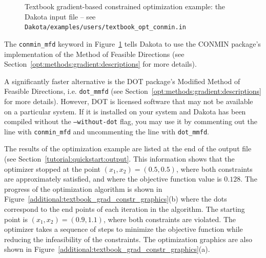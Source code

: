 \begin{figure}[ht!]
  \centering
  \begin{bigbox}
    \begin{small}
    \end{small}
  \end{bigbox}
  \caption{Textbook gradient-based constrained optimization example:
    the Dakota input file --
see \texttt{Dakota/examples/users/textbook\_opt\_conmin.in} }
  \label{additional:textbook_grad_constr}
\end{figure}

The \texttt{conmin\_mfd} keyword in
Figure~\ref{additional:textbook_grad_constr} tells Dakota to use the
CONMIN package's implementation of the Method of Feasible Directions
(see Section~\ref{opt:methods:gradient:descriptions} for more
details).

A significantly faster alternative is the DOT package's Modified
Method of Feasible Directions, i.e. \texttt{dot\_mmfd} (see
Section~\ref{opt:methods:gradient:descriptions} for more
details). However, DOT is licensed software that may not be available
on a particular system. If it is installed on your system and Dakota
has been compiled without the \texttt{--without-dot} flag, you may use
it by commenting out the line with \texttt{conmin\_mfd} and
uncommenting the line with \texttt{dot\_mmfd}.

The results of the optimization example are listed at the end of
the output file (see Section~\ref{tutorial:quickstart:output}.
This information shows that the
optimizer stopped at the point $(x_1,x_2) = (0.5,0.5)$, where both
constraints are approximately satisfied, and where the objective function value is
$0.128$. The progress of the optimization algorithm is shown in
Figure~\ref{additional:textbook_grad_constr_graphics}(b) where the
dots correspond to the end points of each iteration in the algorithm. The
starting point is $(x_1,x_2) = (0.9,1.1)$, where both constraints
are violated. The optimizer takes a
sequence of steps to minimize the objective function while reducing
the infeasibility of the constraints.
The optimization graphics are also shown in
Figure~\ref{additional:textbook_grad_constr_graphics}(a).

